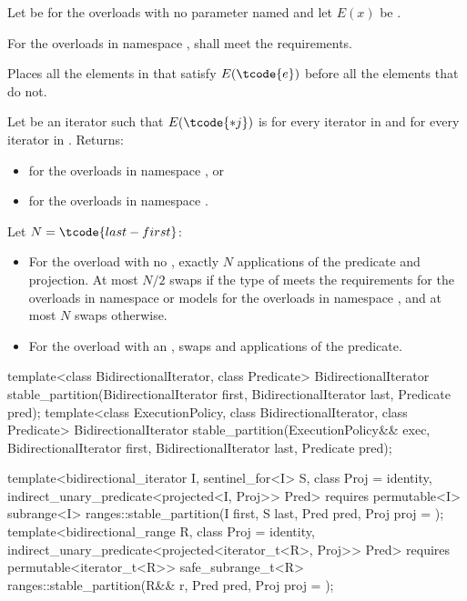 \begin{itemdescr}
\pnum
Let  be 
for the overloads with no parameter named 
and let $E(x)$ be .

\pnum
\requires
For the overloads in namespace ,
 shall meet
the  requirements.

\pnum
\effects
Places all the elements  in 
that satisfy $E(\tcode{e})$ before all the elements that do not.

\pnum
\returns
Let  be an iterator such that $E(\tcode{*j})$ is
 for every iterator  in  and
 for every iterator  in .
Returns:
\begin{itemize}
\item {} for the overloads in namespace , or
\item {} for the overloads in namespace .
\end{itemize}


\pnum
\complexity
Let $N = \tcode{last - first}$:
\begin{itemize}
\item
  For the overload with no ,
  exactly $N$ applications of the predicate and projection.
  At most $N / 2$ swaps if the type of  meets
  the  requirements
  for the overloads in namespace  or
  models 
  for the overloads in namespace ,
  and at most $N$ swaps otherwise.
\item
  For the overload with an ,
   swaps and  applications of the predicate.
\end{itemize}

\end{itemdescr}

%
\begin{itemdecl}
template<class BidirectionalIterator, class Predicate>
  BidirectionalIterator
    stable_partition(BidirectionalIterator first, BidirectionalIterator last, Predicate pred);
template<class ExecutionPolicy, class BidirectionalIterator, class Predicate>
  BidirectionalIterator
    stable_partition(ExecutionPolicy&& exec,
                     BidirectionalIterator first, BidirectionalIterator last, Predicate pred);

template<bidirectional_iterator I, sentinel_for<I> S, class Proj = identity,
         indirect_unary_predicate<projected<I, Proj>> Pred>
  requires permutable<I>
  subrange<I> ranges::stable_partition(I first, S last, Pred pred, Proj proj = {});
template<bidirectional_range R, class Proj = identity,
         indirect_unary_predicate<projected<iterator_t<R>, Proj>> Pred>
  requires permutable<iterator_t<R>>
  safe_subrange_t<R> ranges::stable_partition(R&& r, Pred pred, Proj proj = {});
\end{itemdecl}


